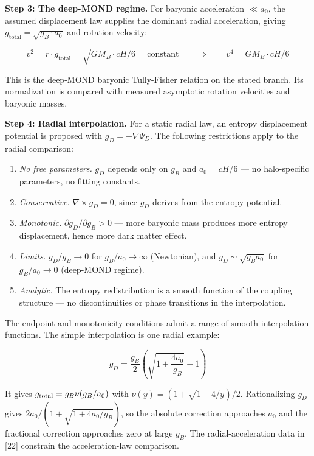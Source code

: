 \documentclass[
]{article}
\begin{document}
\textbf{Step 3: The deep-MOND regime.} For baryonic acceleration
\(\ll a_0\), the assumed displacement law supplies the dominant radial
acceleration, giving \(g_{\text{total}} = \sqrt{g_B \cdot a_0}\) and
rotation velocity:

\[v^2 = r \cdot g_{\text{total}} = \sqrt{GM_B \cdot cH/6} = \text{constant} \qquad \Longrightarrow \qquad v^4 = GM_B \cdot cH/6\]

This is the deep-MOND baryonic Tully-Fisher relation on the stated
branch. Its normalization is compared with measured asymptotic rotation
velocities and baryonic masses.

\textbf{Step 4: Radial interpolation.} For a static radial law, an
entropy displacement potential is proposed with \(g_D=-\nabla\Psi_D\).
The following restrictions apply to the radial comparison:

\begin{enumerate}
\def\labelenumi{(\roman{enumi})}
\item
  \emph{No free parameters.} \(g_D\) depends only on \(g_B\) and
  \(a_0 = cH/6\) --- no halo-specific parameters, no fitting constants.
\item
  \emph{Conservative.} \(\nabla \times g_D = 0\), since \(g_D\) derives
  from the entropy potential.
\item
  \emph{Monotonic.} \(\partial g_D / \partial g_B > 0\) --- more
  baryonic mass produces more entropy displacement, hence more dark
  matter effect.
\item
  \emph{Limits.} \(g_D/g_B\to0\) for \(g_B/a_0\to\infty\) (Newtonian),
  and \(g_D\sim\sqrt{g_Ba_0}\) for \(g_B/a_0\to0\) (deep-MOND regime).
\item
  \emph{Analytic.} The entropy redistribution is a smooth function of
  the coupling structure --- no discontinuities or phase transitions in
  the interpolation.
\end{enumerate}

The endpoint and monotonicity conditions admit a range of smooth
interpolation functions. The simple interpolation is one radial example:

\[g_D = \frac{g_B}{2}\left(\sqrt{1 + \frac{4a_0}{g_B}} - 1\right)\]

It gives \(g_{\rm total}=g_B\nu(g_B/a_0)\) with
\(\nu(y)=(1+\sqrt{1+4/y})/2\). Rationalizing \(g_D\) gives
\(2a_0/(1+\sqrt{1+4a_0/g_B})\), so the absolute correction approaches
\(a_0\) and the fractional correction approaches zero at large \(g_B\).
The radial-acceleration data in {[}22{]} constrain the acceleration-law
comparison.
\end{document}
